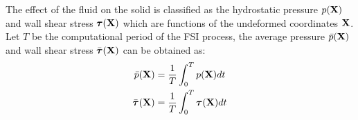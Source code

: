 The effect of the fluid on the solid is classified as the hydrostatic pressure $p(\bold{X})$ and wall shear stress ${\boldsymbol{\tau}}(\bold{X})$ which are functions of the undeformed coordinates $\bold{X}$. Let $T$ be the computational period of the FSI process, the average pressure $\bar{p}(\bold{X})$ and wall shear stress $\bar{\boldsymbol{\tau}}(\bold{X})$ can be obtained as:
\begin{subequations}
\begin{align}
\bar{p}(\bold{X}) &= \frac{1}{T}\int_0^T p(\bold{X}) dt\\
\bar{\boldsymbol{\tau}}(\bold{X}) &= \frac{1}{T}\int_0^T \boldsymbol{\tau}(\bold{X}) dt
\end{align}
\end{subequations}
